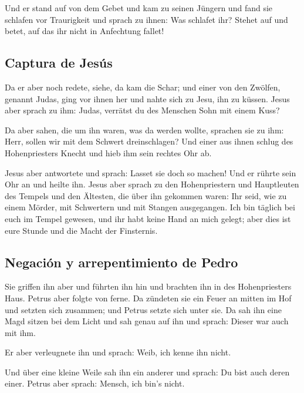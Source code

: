  Und er stand auf von dem Gebet und kam zu seinen Jüngern
und fand sie schlafen vor Traurigkeit  und sprach zu
ihnen: Was schlafet ihr? Stehet auf und betet, auf das ihr nicht in
Anfechtung fallet!

\hypertarget{captura-de-jesuxfas}{%
\subsection{Captura de Jesús}\label{captura-de-jesuxfas}}

 Da er aber noch redete, siehe, da kam die Schar; und
einer von den Zwölfen, genannt Judas, ging vor ihnen her und nahte sich
zu Jesu, ihn zu küssen.  Jesus aber sprach zu ihm: Judas,
verrätst du des Menschen Sohn mit einem Kuss?

 Da aber sahen, die um ihn waren, was da werden wollte,
sprachen sie zu ihm: Herr, sollen wir mit dem Schwert dreinschlagen?
 Und einer aus ihnen schlug des Hohenpriesters Knecht und
hieb ihm sein rechtes Ohr ab.

 Jesus aber antwortete und sprach: Lasset sie doch so
machen! Und er rührte sein Ohr an und heilte ihn.  Jesus
aber sprach zu den Hohenpriestern und Hauptleuten des Tempels und den
Ältesten, die über ihn gekommen waren: Ihr seid, wie zu einem Mörder,
mit Schwertern und mit Stangen ausgegangen.  Ich bin
täglich bei euch im Tempel gewesen, und ihr habt keine Hand an mich
gelegt; aber dies ist eure Stunde und die Macht der Finsternis.

\hypertarget{negaciuxf3n-y-arrepentimiento-de-pedro}{%
\subsection{Negación y arrepentimiento de
Pedro}\label{negaciuxf3n-y-arrepentimiento-de-pedro}}

 Sie griffen ihn aber und führten ihn hin und brachten
ihn in des Hohenpriesters Haus. Petrus aber folgte von ferne.
 Da zündeten sie ein Feuer an mitten im Hof und setzten
sich zusammen; und Petrus setzte sich unter sie.  Da sah
ihn eine Magd sitzen bei dem Licht und sah genau auf ihn und sprach:
Dieser war auch mit ihm.

 Er aber verleugnete ihn und sprach: Weib, ich kenne ihn
nicht.

 Und über eine kleine Weile sah ihn ein anderer und
sprach: Du bist auch deren einer. Petrus aber sprach: Mensch, ich bin's
nicht.

